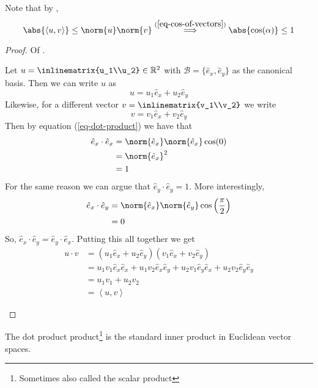 \begin{rem}
	Note that by ,
	\begin{equation*}
		\abs{\left<u,v\right>}\leq\norm{u}\norm{v}\overset{(\ref{eq-cos-of-vectors})}{\implies}\abs{\cos(\alpha)}\leq1
	\end{equation*}
\end{rem}

\begin{proof}
	Of .
	\begin{flushleft}
		Let $u=\inlinematrix{u_1\\u_2}\in\mathbb{R}^2$
		with $\mathcal{B}=\{\hat{e}_x,\hat{e}_y\}$ as the canonical basis. Then we can
		write $u$ as
		\begin{equation*}
			u = u_1\hat{e}_x + u_2\hat{e}_y
		\end{equation*}
		Likewise, for a different vector
		$v=\inlinematrix{v_1\\v_2}$
		we write
		\begin{equation*}
			v = v_1\hat{e}_x + v_2\hat{e}_y
		\end{equation*}
		Then by equation (\ref{eq-dot-product}) we have that
		\begin{align*}
			\hat{e}_x\cdot\hat{e}_x & = \norm{\hat{e}_x}\norm{\hat{e}_x}\cos(0) \\
			                        & = \norm{\hat{e}_x}^2                      \\
			                        & = 1
		\end{align*}
		For the same reason we can argue that $\hat{e}_y\cdot\hat{e}_y=1$. More
		interestingly,
		\begin{align*}
			\hat{e}_x\cdot\hat{e}_y & = \norm{\hat{e}_x}\norm{\hat{e}_y}\cos\left(\frac{\pi}{2}\right) \\
			                        & = 0
		\end{align*}
		So, $\hat{e}_x\cdot\hat{e}_y=\hat{e}_y\cdot\hat{e}_x$. Putting this all
		together we get
		\begin{align*}
			u \cdot v & = (u_1\hat{e}_x + u_2\hat{e}_y)(v_1\hat{e}_x + v_2\hat{e}_y)                                                \\
			          & = u_1v_1\hat{e}_x\hat{e}_x + u_1v_2\hat{e}_x\hat{e}_y + u_2v_1\hat{e}_y\hat{e}_x + u_2v_2\hat{e}_y\hat{e}_y \\
			          & = u_1v_1 + u_2v_2                                                                                           \\
			          & = \left<u,v\right>
		\end{align*}
	\end{flushleft}
\end{proof}

\begin{rem}
	The dot product product\footnote{Sometimes also called the scalar product}
	is the standard inner product in Euclidean vector spaces.
\end{rem}
